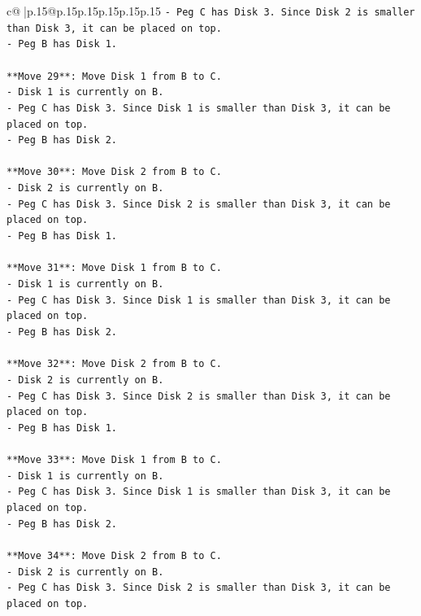 \documentclass{article}
\begin{document}
{\begin{supertabular}{c@{$\;$}|p{.15\linewidth}@{}p{.15\linewidth}p{.15\linewidth}p{.15\linewidth}p{.15\linewidth}p{.15\linewidth}}
{{{\texttt{{-} Peg C has Disk 3. Since Disk 2 is smaller than Disk 3, it can be placed on top.} \\
\texttt{{-} Peg B has Disk 1.} \\
\\ 
\texttt{**Move 29**: Move Disk 1 from B to C.} \\
\texttt{{-} Disk 1 is currently on B.} \\
\texttt{{-} Peg C has Disk 3. Since Disk 1 is smaller than Disk 3, it can be placed on top.} \\
\texttt{{-} Peg B has Disk 2.} \\
\\ 
\texttt{**Move 30**: Move Disk 2 from B to C.} \\
\texttt{{-} Disk 2 is currently on B.} \\
\texttt{{-} Peg C has Disk 3. Since Disk 2 is smaller than Disk 3, it can be placed on top.} \\
\texttt{{-} Peg B has Disk 1.} \\
\\ 
\texttt{**Move 31**: Move Disk 1 from B to C.} \\
\texttt{{-} Disk 1 is currently on B.} \\
\texttt{{-} Peg C has Disk 3. Since Disk 1 is smaller than Disk 3, it can be placed on top.} \\
\texttt{{-} Peg B has Disk 2.} \\
\\ 
\texttt{**Move 32**: Move Disk 2 from B to C.} \\
\texttt{{-} Disk 2 is currently on B.} \\
\texttt{{-} Peg C has Disk 3. Since Disk 2 is smaller than Disk 3, it can be placed on top.} \\
\texttt{{-} Peg B has Disk 1.} \\
\\ 
\texttt{**Move 33**: Move Disk 1 from B to C.} \\
\texttt{{-} Disk 1 is currently on B.} \\
\texttt{{-} Peg C has Disk 3. Since Disk 1 is smaller than Disk 3, it can be placed on top.} \\
\texttt{{-} Peg B has Disk 2.} \\
\\ 
\texttt{**Move 34**: Move Disk 2 from B to C.} \\
\texttt{{-} Disk 2 is currently on B.} \\
\texttt{{-} Peg C has Disk 3. Since Disk 2 is smaller than Disk 3, it can be placed on top.} \\
}}}
\end{supertabular}}
\end{document}
